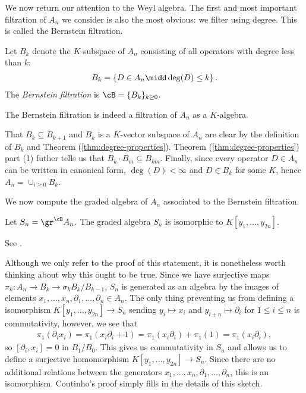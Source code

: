 We now return our attention to the Weyl algebra. The first and most important filtration of $A_n$ we consider is also the most obvious: we filter using degree. This is called the Bernstein filtration.
\begin{defn}\label{defn:bernstein-filtration}
	Let $B_k$ denote the $K$-subspace of $A_n$ consisting of all operators with degree less than $k$:
	\begin{align*}
		B_k = \left\{D \in A_n \midd \deg(D) \leq k\right\}.
	\end{align*}
	The \emph{Bernstein filtration} is $\cB = \{B_k\}_{k\geq 0}$.
\end{defn}
\begin{prop}\label{prop:bernstein-filtration}
	The Bernstein filtration is indeed a filtration of $A_n$ as a $K$-algebra.
\end{prop}
\begin{prf}
	 That $B_k \subseteq B_{k+1}$ and $B_k$ is a $K$-vector subspace of $A_n$ are clear by the definition of $B_k$ and Theorem (\ref{thm:degree-properties}). Theorem (\ref{thm:degree-properties}) part (1) futher tells us that $B_k \cdot B_m \subseteq B_{k\dot m}$. Finally, since every operator $D \in A_n$ can be written in canonical form, $\deg(D) < \infty$ and $D \in B_k$ for some $K$, hence $A_n = \cup_{i\geq 0} B_k$.
\end{prf}
We now compute the graded algebra of $A_n$ associated to the Bernstein filtration.
\begin{thm}\label{thm:graded-algebra-of-Weyl-algebra}
	Let $S_n = \gr^\cB A_n$. The graded algebra $S_n$ is isomorphic to $K[y_1,...,y_{2n}]$.
\end{thm}
\begin{prf}
	See \cite[pg. 58]{d-mod-primer}.
\end{prf}
Although we only refer to the proof of this statement, it is nonetheless worth thinking about why this ought to be true. Since we have surjective maps $\pi_k:A_n\to B_k \to{\sigma_k} B_k/B_{k-1}$, $S_n$ is generated as an algebra by the images of elements $x_1,...,x_n,\partial_1,...,\partial_n \in A_n$. The only thing preventing us from defining a isomorphism $K[y_1,...,y_{2n}]\to S_n$ sending $y_i\mapsto x_i$ and $y_{i+n}\mapsto \partial_{i}$ for $1\leq i\leq n$ is commutativity, however, we see that
\begin{align*}
	\pi_1(\partial_i x_i) = \pi_1(x_i\partial_i + 1) = \pi_1(x_i\partial_i) + \pi_1(1) = \pi_1(x_i\partial_i),
\end{align*}
so $[\partial_i,x_i] = 0$ in $B_1/B_0$. This gives us commutativity in $S_n$ and allows us to define a surjective homomorphism $K[y_1,...,y_{2n}] \to S_n$. Since there are no additional relations between the generators $x_1,...,x_n,\partial_1,...,\partial_n$, this is an isomorphism. Coutinho's proof simply fills in the details of this sketch.

